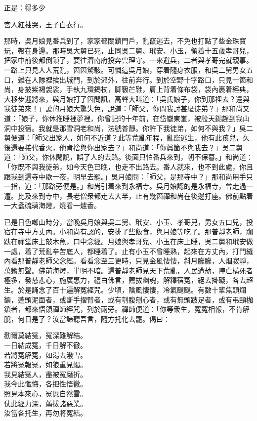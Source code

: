 正是：得多少

\begin{myquote}
宮人紅袖哭，王子白衣行。
\end{myquote}

那時，吳月娘見番兵到了，家家都關鎖門戶，亂竄逃去，不免也打點了些金珠寶玩，帶在身邊。那時吳大舅已死，止同吳二舅、玳安、小玉，領着十五歲孝哥兒，把家中前後都倒鎖了，要往濟南府投奔雲理守。一來避兵，二者與孝哥完就親事。一路上只見人人荒亂，箇箇驚駭。可憐這吳月娘，穿着隨身衣服，和吳二舅男女五口，雜在人隊裡挨出城門，到於郊外，往前奔行。到於空野十字路口，只見一箇和尚，身披紫褐袈裟，手執九環錫杖，脚靸芒鞋，肩上背着條布袋，袋內裹着經典，大移步迎將來，與月娘打了箇問訊，高聲大叫道：「吳氏娘子，你到那裡去？還與我徒弟來！」諕的月娘大驚失色，說道：「師父，你問我討甚麼徒弟？」那和尚又道：「娘子，你休推睡裡夢裡，你曾記的十年前，在岱嶽東峯，被殷天錫趕到我山洞中投宿。我就是那雪洞老和尚，法號普靜。你許下我徒弟，如何不與我？」吳二舅便道：「師父出家人，如何不近道？此等荒亂年程，亂竄逃生，他有此孩兒，久後還要接代香火，他肯捨與你出家去？」和尚道：「你眞箇不與我去？」吳二舅道：「師父，你休閑說，誤了人的去路。後面只怕番兵來到，朝不保暮。」和尚道：「你既不與我徒弟，如今天色已晚，也走不出路去。番人就來，也不到此處，你且跟我到這寺中歇一夜，明早去罷。」吳月娘問：「師父，是那寺中？」那和尚用手只一指，道：「那路旁便是。」和尚引着來到永福寺。吳月娘認的是永福寺，曾走過一遭。比及來到寺中，長老僧衆都走去大半，止有幾箇禪和尚在後邊打座。佛前點着一大盞硫璃海燈，燒看一爐香。

已是日色啣山時分，當晚吳月娘與吳二舅、玳安、小玉、孝哥兒，男女五口兒，投宿在寺中方丈內。小和尚有認的，安排了些飯食，與月娘等吃了。那普靜老師，跏趺在禪堂床上敲木魚，口中念經。月娘與孝哥兒、小玉在床上睡，吳二舅和玳安做一處，着了荒亂辛苦底人，都睡着了。止有小玉不曾睡熟，起來在方丈內，打門縫內看那普靜老師父念經。看看念至三更時，只見金風悽悽，斜月朦朦，人烟寂靜，萬籟無聲。佛前海燈，半明不暗。這普靜老師見天下荒亂，人民遭劫，陣亡橫死者極多，發慈悲心，施廣惠力，禮白佛言，薦拔幽魂，解釋宿冤，絕去掛礙，各去超生。於是誦念了百十遍解冤經咒。少頃，陰風悽悽，冷氣颼颼。有數十輩焦頭爛額，蓬頭泥面者，或斷手摺臂者，或有刳腹剜心者，或有無頭跛足者，或有弔頸枷鎖者，都來悟領禪師經咒，列於兩旁。禪師便道：「你等衆生，冤冤相報，不肯解脫，何日是了？汝當諦聽吾言，隨方托化去罷。偈曰：

\begin{myquote}
勸爾莫結冤，冤深難解結。\\一日結成冤，千日解不徹。\\若將冤解冤，如湯去潑雪。\\若將冤報冤，如狼重見蝎。\\我見結冤人，盡被冤磨折。\\我今此懺悔，各把性悟徹。\\照見本來心，冤愆自然雪。\\仗此經力深，薦拔諸惡業。\\汝當各托生，再勿將冤結。{}
\end{myquote}

